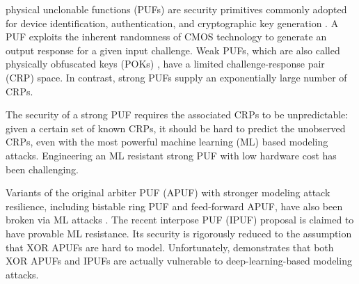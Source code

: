  physical unclonable functions (PUFs) are security primitives commonly adopted for device identification, authentication, and cryptographic key generation \cite{suh2007physical}.
A PUF exploits the inherent randomness of CMOS technology to generate an output response for a given input challenge. Weak PUFs, which are also called physically obfuscated keys (POKs) \cite{herder2017trapdoor}, have a limited challenge-response pair (CRP) space. In contrast, strong PUFs supply an exponentially large number of CRPs.

The security of a strong PUF requires the associated CRPs to be unpredictable: given a certain set of known CRPs, it should be hard to predict the unobserved CRPs, even with the most powerful machine learning (ML) based modeling attacks. Engineering an ML resistant strong PUF with low hardware cost has been challenging. %

Variants of the original arbiter PUF (APUF) with stronger modeling attack resilience, including bistable ring PUF and feed-forward APUF, %
have also been broken via  ML attacks \cite{schuster2014evaluation, ruhrmair2010modeling}. %
The recent interpose PUF (IPUF) \cite{nguyen2019interpose} proposal is claimed to have provable ML resistance. Its security is rigorously reduced to the assumption that XOR APUFs are hard to model. Unfortunately, \cite{DBLP:journals/iacr/SantikellurBC19} demonstrates that both XOR APUFs and IPUFs are actually vulnerable to deep-learning-based modeling attacks.


